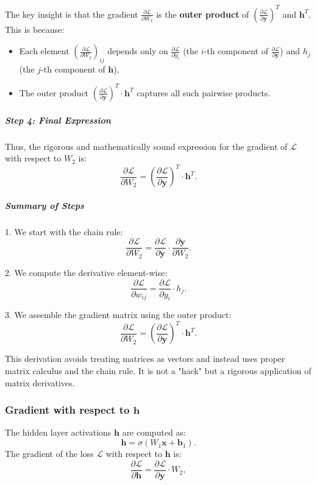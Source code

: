 \begin{notechapter}
The key insight is that the gradient \( \frac{\partial \mathcal{L}}{\partial W_2} \) is the \textbf{outer product} of \( \left( \frac{\partial \mathcal{L}}{\partial \mathbf{y}} \right)^T \) and \( \mathbf{h}^T \). This is because:
\begin{itemize}
    \item Each element \( \left( \frac{\partial \mathcal{L}}{\partial W_2} \right)_{ij} \) depends only on \( \frac{\partial \mathcal{L}}{\partial y_i} \) (the \( i \)-th component of \( \frac{\partial \mathcal{L}}{\partial \mathbf{y}} \)) and \( h_j \) (the \( j \)-th component of \( \mathbf{h} \)),
    \item The outer product \( \left( \frac{\partial \mathcal{L}}{\partial \mathbf{y}} \right)^T \cdot \mathbf{h}^T \) captures all such pairwise products.
\end{itemize}

\subparagraph*{Step 4: Final Expression}

Thus, the rigorous and mathematically sound expression for the gradient of \( \mathcal{L} \) with respect to \( W_2 \) is:
\[
\frac{\partial \mathcal{L}}{\partial W_2} = \left( \frac{\partial \mathcal{L}}{\partial \mathbf{y}} \right)^T \cdot \mathbf{h}^T.
\]

\subparagraph*{Summary of Steps}

1. We start with the chain rule:
   \[
   \frac{\partial \mathcal{L}}{\partial W_2} = \frac{\partial \mathcal{L}}{\partial \mathbf{y}} \cdot \frac{\partial \mathbf{y}}{\partial W_2}.
   \]

2. We compute the derivative element-wise:
   \[
   \frac{\partial \mathcal{L}}{\partial w_{ij}} = \frac{\partial \mathcal{L}}{\partial y_i} \cdot h_j.
   \]

3. We assemble the gradient matrix using the outer product:
   \[
   \frac{\partial \mathcal{L}}{\partial W_2} = \left( \frac{\partial \mathcal{L}}{\partial \mathbf{y}} \right)^T \cdot \mathbf{h}^T.
   \]

This derivation avoids treating matrices as vectors and instead uses proper matrix calculus and the chain rule. It is not a "hack" but a rigorous application of matrix derivatives.
\subsubsection{Gradient with respect to \( \mathbf{h} \)}
The hidden layer activations \( \mathbf{h} \) are computed as:
\[
\mathbf{h} = \sigma(W_1 \mathbf{x} + \mathbf{b}_1).
\]
The gradient of the loss \( \mathcal{L} \) with respect to \( \mathbf{h} \) is:
\[
\frac{\partial \mathcal{L}}{\partial \mathbf{h}} = \frac{\partial \mathcal{L}}{\partial \mathbf{y}} \cdot W_2,
\]


\end{notechapter}

